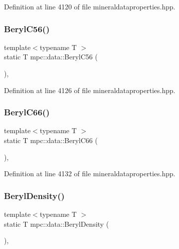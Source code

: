 Definition at line 4120 of file mineraldataproperties.\+hpp.

\mbox{\label{namespacempc_1_1data_a7c9e221e0ee89f1a729680e6e099e8fb}} 
\subsubsection{\texorpdfstring{Beryl\+C56()}{BerylC56()}}
{\footnotesize\ttfamily template$<$typename T $>$ \\
static T mpc\+::data\+::\+Beryl\+C56 (\begin{DoxyParamCaption}{ }\end{DoxyParamCaption})\hspace{0.3cm}{\ttfamily [inline]}, {\ttfamily [static]}}



Definition at line 4126 of file mineraldataproperties.\+hpp.

\mbox{\label{namespacempc_1_1data_a229a68e56f887a1d88b0bcddee613a0b}} 
\subsubsection{\texorpdfstring{Beryl\+C66()}{BerylC66()}}
{\footnotesize\ttfamily template$<$typename T $>$ \\
static T mpc\+::data\+::\+Beryl\+C66 (\begin{DoxyParamCaption}{ }\end{DoxyParamCaption})\hspace{0.3cm}{\ttfamily [inline]}, {\ttfamily [static]}}



Definition at line 4132 of file mineraldataproperties.\+hpp.

\mbox{\label{namespacempc_1_1data_abce68d7af2caef318a1469ebeefd90f2}} 
\subsubsection{\texorpdfstring{Beryl\+Density()}{BerylDensity()}}
{\footnotesize\ttfamily template$<$typename T $>$ \\
static T mpc\+::data\+::\+Beryl\+Density (\begin{DoxyParamCaption}{ }\end{DoxyParamCaption})\hspace{0.3cm}{\ttfamily [inline]}, {\ttfamily [static]}}



